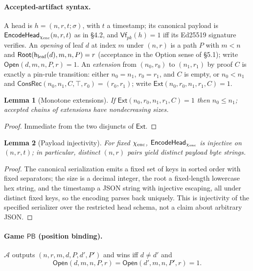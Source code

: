 \documentclass[11pt]{article}
\newtheorem{lemma}{Lemma}
\theoremstyle{remark}
\newcommand{\hleaf}{\mathsf{h}_{\rm leaf}}
\newcommand{\Root}{\mathsf{Root}}
\newcommand{\ConsRec}{\mathsf{ConsRec}}
\begin{document}
\paragraph{Accepted-artifact syntax.}
A head is $h=(n,r,t;\sigma)$, with $t$ a timestamp; its canonical payload is
$\mathsf{EncodeHead}_{\chi_{\rm enc}}(n,r,t)$ as in \S4.2, and $\mathsf{Vf}_{pk}(h)=1$
iff its Ed25519 signature verifies. An \emph{opening}
of leaf $d$ at index $m$ under $(n,r)$ is a path $P$ with $m<n$ and
$\Root(\hleaf(d),m,n,P)=r$ (acceptance in the Option sense of \S5.1); write
$\mathsf{Open}(d,m,n,P,r)=1$. An \emph{extension} from $(n_0,r_0)$ to
$(n_1,r_1)$ by proof $C$ is exactly a pin-rule transition: either $n_0=n_1$,
$r_0=r_1$, and $C$ is empty, or $n_0<n_1$ and
$\ConsRec(n_0,n_1,C,\top,r_0)=(r_0,r_1)$; write
$\mathsf{Ext}(n_0,r_0,n_1,r_1,C)=1$.

\begin{lemma}[Monotone extensions]\label{lem:mono}
If $\mathsf{Ext}(n_0,r_0,n_1,r_1,C)=1$ then $n_0\le n_1$; accepted chains of
extensions have nondecreasing sizes.
\end{lemma}
\begin{proof}
Immediate from the two disjuncts of $\mathsf{Ext}$.
\end{proof}

\begin{lemma}[Payload injectivity]\label{lem:inj}
For fixed $\chi_{\rm enc}$, $\mathsf{EncodeHead}_{\chi_{\rm enc}}$ is
injective on $(n,r,t)$; in particular, distinct $(n,r)$ pairs yield distinct
payload byte strings.
\end{lemma}
\begin{proof}
The canonical serialization emits a fixed set of keys in sorted order with
fixed separators; the size is a decimal integer, the root a fixed-length
lowercase hex string, and the timestamp a JSON string with injective
escaping, all under distinct fixed keys, so the encoding parses back
uniquely. This is injectivity of the specified serializer over the restricted
head schema, not a claim about arbitrary JSON.
\end{proof}

\paragraph{Game $\mathsf{PB}$ (position binding).}
$\mathcal{A}$ outputs $(n,r,m,d,P,d',P')$ and wins iff $d\neq d'$ and
\[\mathsf{Open}(d,m,n,P,r)=\mathsf{Open}(d',m,n,P',r)=1.\]
\end{document}
